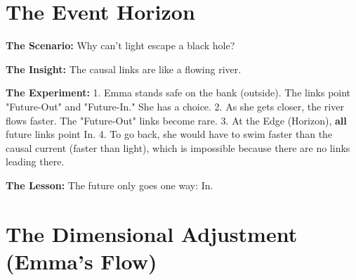 \documentclass[11pt, a4paper, openany]{book}
\begin{document}

\section{The Event Horizon}

\begin{thoughtexp}
\textbf{The Scenario:} Why can't light escape a black hole?

\textbf{The Insight:} The causal links are like a flowing river.

\textbf{The Experiment:}
1. Emma stands safe on the bank (outside). The links point "Future-Out" and "Future-In." She has a choice.
2. As she gets closer, the river flows faster. The "Future-Out" links become rare.
3. At the Edge (Horizon), \textbf{all} future links point In.
4. To go back, she would have to swim faster than the causal current (faster than light), which is impossible because there are no links leading there.

\textbf{The Lesson:} The future only goes one way: In.
\end{thoughtexp}


\section{The Dimensional Adjustment (Emma's Flow)}
\end{document}
